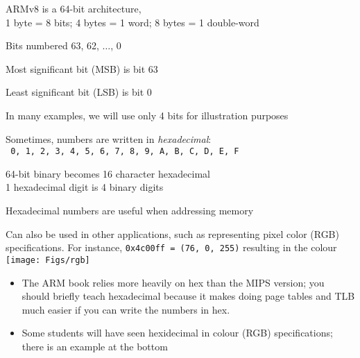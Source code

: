 \begin{frame}[fragile]
\begin{itemize}
\item ARMv8 is a 64-bit architecture, \\
{\small 1 byte = 8 bits; 4 bytes = 1 word; 8 bytes = 1 double-word}
\item Bits numbered 63, 62, $\ldots$, 0
\item Most significant bit (MSB) is bit 63
\item Least significant bit (LSB) is bit 0
{\footnotesize
\item In many examples, we will use only 4 bits for illustration purposes}
\item Sometimes, numbers are written in {\em hexadecimal}:\\
\small \texttt{  0, 1, 2, 3, 4, 5, 6, 7, 8, 9, A, B, C, D, E, F}

\item  64-bit binary becomes 16 character hexadecimal\\
{\footnotesize 1 hexadecimal digit is 4 binary digits}
\item Hexadecimal numbers are useful when addressing memory
\item Can also be used in other applications, such as representing pixel color (RGB) specifications. For instance, \texttt{0x4c00ff = (76, 0, 255)} resulting in the colour	\\	
\texttt{[image: Figs/rgb]} 
\end{itemize}
\BNotes\ifnum{}
\begin{itemize}
	\item The ARM book relies more heavily on hex than the MIPS version;
	  you should briefly
          teach hexadecimal because it makes doing page tables and
	  TLB much easier if you can write the numbers in hex.

  \item  Some students will have seen hexidecimal in colour (RGB)
          specifications; there is an example at the bottom
\end{itemize}
\fi\ENotes
\end{frame}


